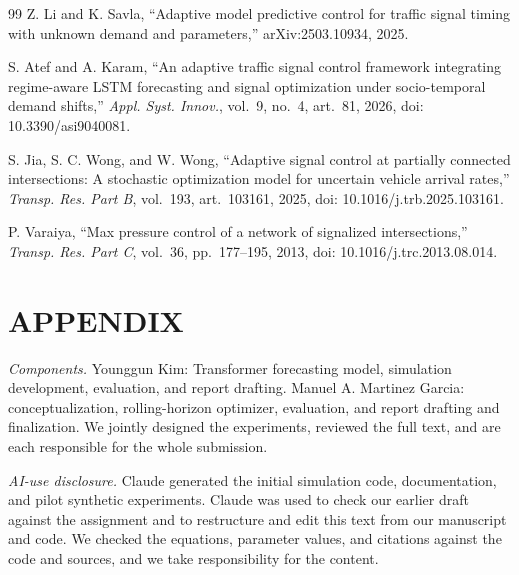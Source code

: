 \documentclass[letterpaper,12pt,conference]{ieeeconf}
\begin{document}
\begin{thebibliography}{99}
Z. Li and K. Savla, ``Adaptive model predictive control for
traffic signal timing with unknown demand and parameters,''
arXiv:2503.10934, 2025.

S. Atef and A. Karam, ``An adaptive traffic signal control
framework integrating regime-aware LSTM forecasting and signal
optimization under socio-temporal demand shifts,''
\textit{Appl. Syst. Innov.}, vol.~9, no.~4, art.~81, 2026,
doi: 10.3390/asi9040081.

S. Jia, S. C. Wong, and W. Wong, ``Adaptive signal control at
partially connected intersections: A stochastic optimization model
for uncertain vehicle arrival rates,'' \textit{Transp. Res. Part B},
vol.~193, art.~103161, 2025, doi: 10.1016/j.trb.2025.103161.

P. Varaiya, ``Max pressure control of a network of signalized
intersections,'' \textit{Transp. Res. Part C}, vol.~36,
pp.~177--195, 2013, doi: 10.1016/j.trc.2013.08.014.

\end{thebibliography}

\section*{APPENDIX}

\emph{Components.} Younggun Kim: Transformer forecasting model,
simulation development, evaluation, and report drafting. Manuel A.
Martinez Garcia: conceptualization, rolling-horizon optimizer,
evaluation, and report drafting and finalization. We jointly
designed the experiments, reviewed the full text, and are each
responsible for the whole submission.

\emph{AI-use disclosure.} Claude generated the initial
simulation code, documentation, and pilot synthetic experiments.
Claude was used to check our earlier draft against the
assignment and to restructure and edit this text from our
manuscript and code. We checked the equations, parameter values,
and citations against the code and sources, and we take
responsibility for the content.
\end{document}
